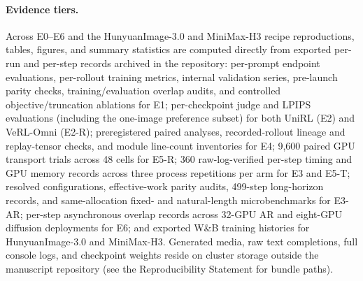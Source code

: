 \documentclass[10pt]{article}
\begin{document}
\paragraph{Evidence tiers.}
Across E0--E6 and the HunyuanImage-3.0 and MiniMax-H3 recipe reproductions, tables, figures, and summary statistics are computed directly from exported per-run and per-step records archived in the repository: per-prompt endpoint evaluations, per-rollout training metrics, internal validation series, pre-launch parity checks, training/evaluation overlap audits, and controlled objective/truncation ablations for E1; per-checkpoint judge and LPIPS evaluations (including the one-image preference subset) for both UniRL (E2) and VeRL-Omni (E2-R); preregistered paired analyses, recorded-rollout lineage and replay-tensor checks, and module line-count inventories for E4; 9,600 paired GPU transport trials across 48 cells for E5-R; 360 raw-log-verified per-step timing and GPU memory records across three process repetitions per arm for E3 and E5-T; resolved configurations, effective-work parity audits, 499-step long-horizon records, and same-allocation fixed- and natural-length microbenchmarks for E3-AR; per-step asynchronous overlap records across 32-GPU AR and eight-GPU diffusion deployments for E6; and exported W\&B training histories for HunyuanImage-3.0 and MiniMax-H3.
Generated media, raw text completions, full console logs, and checkpoint weights reside on cluster storage outside the manuscript repository (see the Reproducibility Statement for bundle paths).
\end{document}
